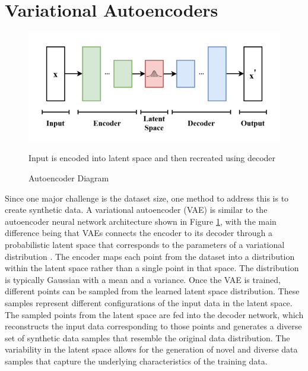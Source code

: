 \section{Variational Autoencoders}
\begin{figure}[h!]
  \centering
    \includegraphics[width=1.0\textwidth]{figures/autoencoder_architecture.png}
    \caption{Autoencoder Diagram}
    \label{autoencoder_diagram}
    Input is encoded into latent space and then recreated using decoder
\end{figure}
Since one major challenge is the dataset size, one method to address this is to create synthetic data. 
A variational autoencoder (VAE) is similar to the autoencoder neural network architecture shown in Figure \ref{autoencoder_diagram}, with the main difference being that VAEs connects the encoder to its decoder through a probabilistic latent space that corresponds to the parameters of a variational distribution \cite{PinheiroCinelli2021}. The encoder maps each point from the dataset into a distribution within the latent space rather than a single point in that space. The distribution is typically Gaussian with a mean and a variance. Once the VAE is trained, different points can be sampled from the learned latent space distribution. These samples represent different configurations of the input data in the latent space. The sampled points from the latent space are fed into the decoder network, which reconstructs the input data corresponding to those points and generates a diverse set of synthetic data samples that resemble the original data distribution. The variability in the latent space allows for the generation of novel and diverse data samples that capture the underlying characteristics of the training data.
